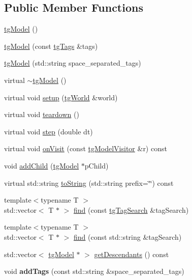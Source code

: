 \subsection*{Public Member Functions}
\begin{DoxyCompactItemize}
\item 
\hyperlink{classtg_model_ad3dcf447df86ab9e15818c209c3a93ba}{tg\-Model} ()
\item 
\hyperlink{classtg_model_a19d54bf0a26870bce18c2e3e349d3740}{tg\-Model} (const \hyperlink{classtg_tags}{tg\-Tags} \&tags)
\item 
\hyperlink{classtg_model_a42de6ad2a4768ebfbd619e85b383a711}{tg\-Model} (std\-::string space\-\_\-separated\-\_\-tags)
\item 
virtual \hyperlink{classtg_model_a134e7bfccef57177a2bce34a14ce6545}{$\sim$tg\-Model} ()
\item 
virtual void \hyperlink{classtg_model_a85c68e064972f67c61c47ead392cf6f8}{setup} (\hyperlink{classtg_world}{tg\-World} \&world)
\item 
virtual void \hyperlink{classtg_model_adb5eec1dcf70a8c039850aea144dcc7e}{teardown} ()
\item 
virtual void \hyperlink{classtg_model_acc6f9ae005f9f51447d7efe5f1815737}{step} (double dt)
\item 
virtual void \hyperlink{classtg_model_aee6457e0fc54d5570b87bfc779f9b1c0}{on\-Visit} (const \hyperlink{classtg_model_visitor}{tg\-Model\-Visitor} \&r) const 
\item 
void \hyperlink{classtg_model_a292c17848b96caee32b2286e44c13f2f}{add\-Child} (\hyperlink{classtg_model}{tg\-Model} $\ast$p\-Child)
\item 
virtual std\-::string \hyperlink{classtg_model_af37b0c1a6d4060bfe0bb9b5038a17725}{to\-String} (std\-::string prefix=\char`\"{}\char`\"{}) const 
\item 
{\footnotesize template$<$typename T $>$ }\\std\-::vector$<$ T $\ast$ $>$ \hyperlink{classtg_model_ab75836fdfbd9200f165c3b28a19630c0}{find} (const \hyperlink{classtg_tag_search}{tg\-Tag\-Search} \&tag\-Search)
\item 
{\footnotesize template$<$typename T $>$ }\\std\-::vector$<$ T $\ast$ $>$ \hyperlink{classtg_model_aa40b5fb32f8941e04d537f4e6c6db35c}{find} (const std\-::string \&tag\-Search)
\item 
std\-::vector$<$ \hyperlink{classtg_model}{tg\-Model} $\ast$ $>$ \hyperlink{classtg_model_a2efa4321fa5c77b4ce23b01f6fd3a1c4}{get\-Descendants} () const 
\item 
\hypertarget{classtg_taggable_af0b8f1729653b0b90d2fecbd51163612}{void {\bfseries add\-Tags} (const std\-::string \&space\-\_\-separated\-\_\-tags)}\label{classtg_taggable_af0b8f1729653b0b90d2fecbd51163612}


\end{DoxyCompactItemize}
